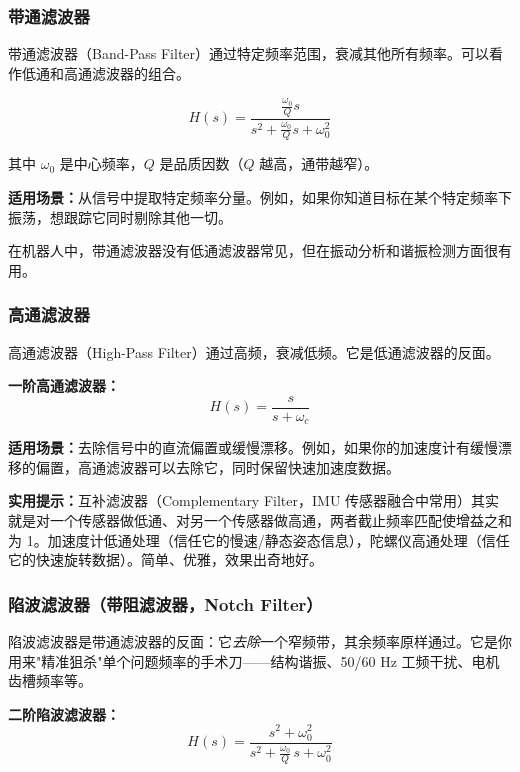 \subsubsection{带通滤波器}

带通滤波器（Band-Pass Filter）通过特定频率范围，衰减其他所有频率。可以看作低通和高通滤波器的组合。

\begin{equation}
H(s) = \frac{\frac{\omega_0}{Q} s}{s^2 + \frac{\omega_0}{Q} s + \omega_0^2}
\end{equation}

其中 $\omega_0$ 是中心频率，$Q$ 是品质因数（$Q$ 越高，通带越窄）。

\textbf{适用场景：}从信号中提取特定频率分量。例如，如果你知道目标在某个特定频率下振荡，想跟踪它同时剔除其他一切。

在机器人中，带通滤波器没有低通滤波器常见，但在振动分析和谐振检测方面很有用。

\subsubsection{高通滤波器}

高通滤波器（High-Pass Filter）通过高频，衰减低频。它是低通滤波器的反面。

\textbf{一阶高通滤波器：}
\begin{equation}
H(s) = \frac{s}{s + \omega_c}
\end{equation}

\textbf{适用场景：}去除信号中的直流偏置或缓慢漂移。例如，如果你的加速度计有缓慢漂移的偏置，高通滤波器可以去除它，同时保留快速加速度数据。

\textbf{实用提示：}互补滤波器（Complementary Filter，IMU 传感器融合中常用）其实就是对一个传感器做低通、对另一个传感器做高通，两者截止频率匹配使增益之和为 1。加速度计低通处理（信任它的慢速/静态姿态信息），陀螺仪高通处理（信任它的快速旋转数据）。简单、优雅，效果出奇地好。

\subsubsection{陷波滤波器（带阻滤波器，Notch Filter）}

陷波滤波器是带通滤波器的反面：它\emph{去除}一个窄频带，其余频率原样通过。它是你用来"精准狙杀"单个问题频率的手术刀——结构谐振、50/60 Hz 工频干扰、电机齿槽频率等。

\textbf{二阶陷波滤波器：}
\begin{equation}
H(s) = \frac{s^2 + \omega_0^2}{s^2 + \frac{\omega_0}{Q}\,s + \omega_0^2}
\end{equation}


